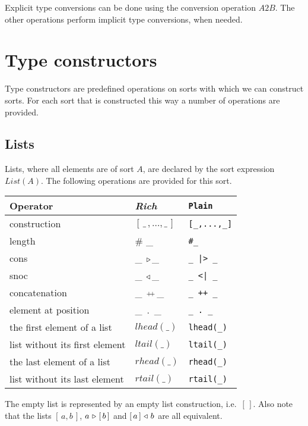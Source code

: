 \documentclass[a4paper,fleqn]{article}
\newcommand{\frm}[1]{\mbox{\ensuremath{#1}}}
\newcommand{\f}[1]{\ensuremath{\mathit{#1}}}
\newcommand{\fa}[2]{\ensuremath{\f{#1}(#2)}}
\newcommand{\lst}[1]{\ensuremath{[\,#1\,]}}
\newcommand{\el}{\ensuremath{[\,]}}
\newcommand{\cons}{\ensuremath{\hspace{0.12em}\triangleright\hspace{0.08em}}}
\newcommand{\snoc}{\ensuremath{\hspace{0.08em}\triangleleft\hspace{0.12em}}}
\newcommand{\concat}{\ensuremath{\hspace{0.12em}\raisebox{0.2ex}
{\text{\scriptsize+}\!\text{\scriptsize+}}\hspace{0.12em}}}
\begin{document}
\noindent
Explicit type conversions can be done using the conversion operation
\frm{\f{A2B}}. The other operations perform implicit type conversions, when
needed.

\section{Type constructors}
\label{sec:TypeConstructors}

Type constructors are predefined operations on sorts with which we can
construct sorts. For each sort that is constructed this way a number of
operations are provided.

\subsection{Lists}

Lists, where all elements are of sort \frm{A}, are declared by the sort
expression \frm{\fa{List}{A}}. The following operations are provided for this
sort.

\bigskip
\begin{tabular}{|l@{\qquad}L@{\qquad}l|}
\hline
Operator                       & \textit{Rich}          & \verb+Plain+\\\hline
construction                   & \lst{\_\,,\ldots,\_}   & \verb+[_,...,_]+\\
length                         & \# \_                  & \verb+#_+\\
cons                           & \_ \cons \_            & \verb+_ |> _+\\
snoc                           & \_ \snoc \_            & \verb+_ <| _+\\
concatenation                  & \_ \concat \_          & \verb-_ ++ _-\\
element at position            & \_\ .\ \_                & \verb+_ . _+\\
the first element of a list    & \fa{lhead}{\_}         & \verb+lhead(_)+\\
list without its first element & \fa{ltail}{\_}         & \verb+ltail(_)+\\
the last element of a list     & \fa{rhead}{\_}         & \verb+rhead(_)+\\
list without its last element  & \fa{rtail}{\_}         & \verb+rtail(_)+\\
\hline
\end{tabular}\bigskip

\noindent
The empty list is represented by an empty list construction, i.e.\ \frm{\el}.
Also note that the lists \frm{\lst{a,b}}, \frm{a \cons \lst{b}} and
\frm{\lst{a} \snoc b} are all equivalent.
\end{document}
